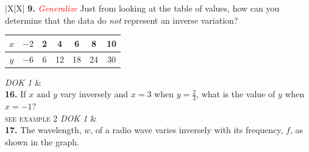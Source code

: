 \documentclass[11pt]{article}
\begin{document}
\renewcommand{\arraystretch}{1.3}
\begin{tabularx}{\linewidth}{|X|X|}
\hline
\textbf{9.} \textcolor{red}{\textit{Generalize}} Just from looking at the table of values, how can you determine that the data do \textit{not} represent an inverse variation?
\vspace{0.3em}

\begin{center}
\begin{tabular}{|c|c|c|c|c|c|c|}
  \hline
  $x$ & $-2$ & 2 & 4 & 6  & 8  & 10 \\ \hline
  $y$ & $-6$ & 6 & 12& 18 & 24 & 30 \\ \hline
\end{tabular}
\end{center}
\vspace{0.2em}
\hfill \textit{\small DOK 1}
&
\vspace{1.8in}
\\ \hline
\textbf{16.} If $x$ and $y$ vary inversely and $x=3$ when $y=\tfrac{2}{3}$, what is the value of $y$ when $x=-1$? \\ \textsc{\small see example 2}
\vspace{0.2em}
\hfill \textit{\small DOK 1}
&
\vspace{1.8in}
\\ \hline
\textbf{17.} The wavelength, $w$, of a radio wave varies inversely with its frequency, $f$, as shown in the graph.
\vspace{0.3em}

\begin{center}
\end{center}


\end{tabularx}
\end{document}
